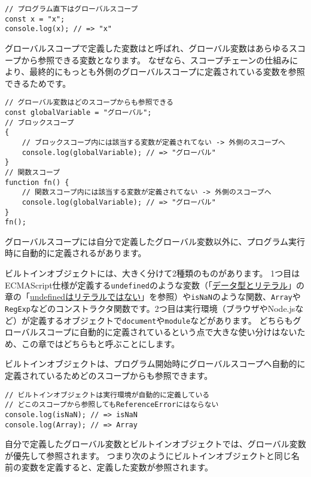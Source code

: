 \begin{lstlisting}
// プログラム直下はグローバルスコープ
const x = "x";
console.log(x); // => "x"
\end{lstlisting}

グローバルスコープで定義した変数は\textbf{}と呼ばれ、グローバル変数はあらゆるスコープから参照できる変数となります。
なぜなら、スコープチェーンの仕組みにより、最終的にもっとも外側のグローバルスコープに定義されている変数を参照できるためです。

\begin{lstlisting}
// グローバル変数はどのスコープからも参照できる
const globalVariable = "グローバル";
// ブロックスコープ
{   
    // ブロックスコープ内には該当する変数が定義されてない -> 外側のスコープへ
    console.log(globalVariable); // => "グローバル"
}
// 関数スコープ
function fn() {
    // 関数スコープ内には該当する変数が定義されてない -> 外側のスコープへ
    console.log(globalVariable); // => "グローバル"
}
fn();
\end{lstlisting}

グローバルスコープには自分で定義したグローバル変数以外に、プログラム実行時に自動的に定義される\textbf{}があります。

ビルトインオブジェクトには、大きく分けて2種類のものがあります。
1つ目はECMAScript仕様が定義する\texttt{undefined}のような変数（「\hyperlink{data-type-and-literal}{データ型とリテラル}」の章の「\hyperlink{undefined-is-not-literal}{undefinedはリテラルではない}」を参照）や\texttt{isNaN}のような関数、\texttt{Array}や\texttt{RegExp}などのコンストラクタ関数です。2つ目は実行環境（ブラウザやNode.jsなど）が定義するオブジェクトで\texttt{document}や\texttt{module}などがあります。
どちらもグローバルスコープに自動的に定義されているという点で大きな使い分けはないため、この章ではどちらも\textbf{}と呼ぶことにします。

ビルトインオブジェクトは、プログラム開始時にグローバルスコープへ自動的に定義されているためどのスコープからも参照できます。

\begin{lstlisting}
// ビルトインオブジェクトは実行環境が自動的に定義している
// どこのスコープから参照してもReferenceErrorにはならない
console.log(isNaN); // => isNaN
console.log(Array); // => Array
\end{lstlisting}

自分で定義したグローバル変数とビルトインオブジェクトでは、グローバル変数が優先して参照されます。
つまり次のようにビルトインオブジェクトと同じ名前の変数を定義すると、定義した変数が参照されます。

